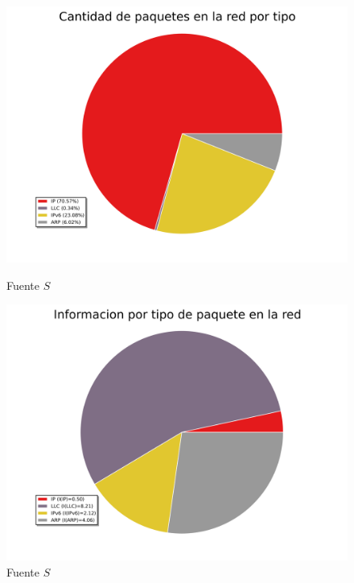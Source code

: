 \begin{figure}[ht!]
  \centering
  \begin{minipage}[b]{0.48\textwidth}
    \includegraphics[width=\textwidth]{graficos/red_baufest_pie_type.png}
    \caption{Fuente $S$}
    \label{fig:red_baufest_pie_type}
  \end{minipage}
  \hfill
  \begin{minipage}[b]{0.48\textwidth}
    \includegraphics[width=\textwidth]{graficos/red_baufest_pie_type_information.png}
    \caption{Fuente $S$}
    \label{fig:red_baufest_pie_type_information}
  \end{minipage}
\end{figure}

